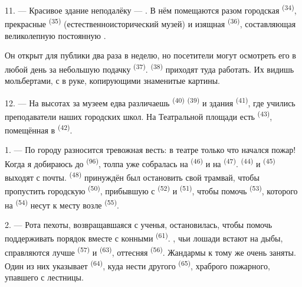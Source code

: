 11. --- Красивое здание неподалёку --- . В нём помещаются
разом городская  \textsuperscript{(34)}, прекрасные
 \textsuperscript{(35)} (естественноисторический
музей) и изящная  \textsuperscript{(36)}, составляющая
великолепную постоянную .

Он открыт для публики два раза в неделю, но посетители могут осмотреть
его в любой день за небольшую подачку  \textsuperscript{(37)}.
 \textsuperscript{(38)} приходят туда работать. Их видишь
 мольбертами, с  в руке, копирующими знаменитые
картины.

12. --- На высотах за музеем едва различаешь  \textsuperscript{(40)}
 \textsuperscript{(39)} и здания 
\textsuperscript{(41)}, где учились преподаватели наших городских школ. На
Театральной площади есть  \textsuperscript{(43)}, помещённая в
 \textsuperscript{(42)}.

\VUsaut{5.0mm}
\VUsaut{3.0mm}

\VUsaut{3.4mm}

1. --- По городу разносится тревожная весть: в театре только что начался
пожар! Когда я добираюсь до  \textsuperscript{(96)}, толпа уже
собралась на  \textsuperscript{(46)} и на 
\textsuperscript{(47)}.  \textsuperscript{(44)} и
 \textsuperscript{(45)} выходят с почты. 
\textsuperscript{(48)} принуждён был остановить свой трамвай, чтобы пропустить
городскую  \textsuperscript{(50)}, прибывшую с
 \textsuperscript{(52)} и  \textsuperscript{(51)},
чтобы помочь  \textsuperscript{(53)}, которого на 
\textsuperscript{(54)} несут к месту возле 
\textsuperscript{(55)}.

2. --- Рота пехоты, возвращавшаяся с ученья, остановилась, чтобы помочь
поддерживать порядок вместе с конными 
\textsuperscript{(61)}. , чьи лошади встают на дыбы, справляются
лучше  \textsuperscript{(57)} и 
\textsuperscript{(63)}, оттесняя  \textsuperscript{(56)}. Жандармы к тому же
очень заняты. Один из них указывает  \textsuperscript{(64)},
куда нести другого  \textsuperscript{(65)}, храброго
пожарного, упавшего с лестницы.

